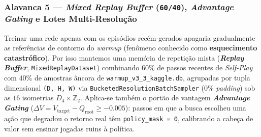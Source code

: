 \documentclass[11pt,a4paper]{article}
\begin{document}
\begin{table}[htbp]
\centering
\caption{Componentes da função de perda no ajuste fino misto Stage 6 (\texttt{float32} sob \texttt{AMP}).}
\label{tab:stage6-losses}
\end{table}

\subsubsection{Alavanca 5 — \emph{Mixed Replay Buffer} (\texttt{60/40}), \emph{Advantage Gating} e Lotes Multi-Resolução}
Treinar uma rede apenas com os episódios recém-gerados apagaria gradualmente as referências de contorno do \emph{warmup} (fenômeno conhecido como \textbf{esquecimento catastrófico}). Por isso mantemos uma memória de repetição mista (\textbf{\emph{Replay Buffer}}, \texttt{MixedReplayDataset}) combinando $60\%$ de passos recentes de \emph{Self-Play} com $40\%$ de amostras âncora de \texttt{warmup\_v3\_3\_kaggle.db}, agrupadas por tupla dimensional \texttt{(D, H, W)} via \texttt{BucketedResolutionBatchSampler} ($0\%$ \emph{padding}) sob as $16$ isometrias $D_4\times\mathbb{Z}_2$. Aplica-se também o portão de vantagem \textbf{\emph{Advantage Gating}} ($\Delta V = V_{\mathrm{target}} - Q_{\mathrm{root}} \ge -0.005$): passos em que a busca escolheu uma ação que degradou o retorno real têm \texttt{policy\_mask = 0}, calibrando a cabeça de valor sem ensinar jogadas ruins à política.
\end{document}
